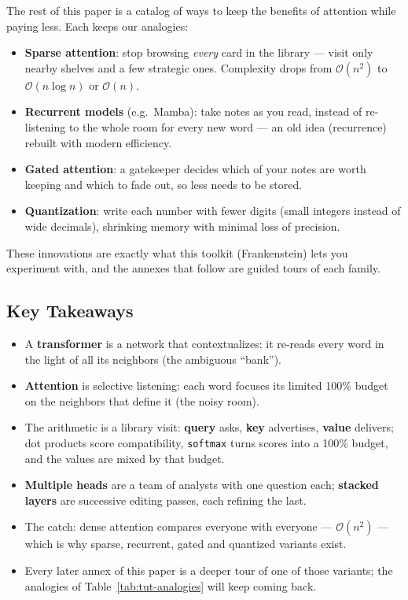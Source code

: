 The rest of this paper is a catalog of ways to keep the benefits of attention while paying less. Each keeps our analogies:

\begin{itemize}[leftmargin=*]
    \item \textbf{Sparse attention}: stop browsing \emph{every} card in the library --- visit only nearby shelves and a few strategic ones. Complexity drops from $\mathcal{O}(n^2)$ to $\mathcal{O}(n \log n)$ or $\mathcal{O}(n)$.
    \item \textbf{Recurrent models} (e.g.\ Mamba): take notes as you read, instead of re-listening to the whole room for every new word --- an old idea (recurrence) rebuilt with modern efficiency.
    \item \textbf{Gated attention}: a gatekeeper decides which of your notes are worth keeping and which to fade out, so less needs to be stored.
    \item \textbf{Quantization}: write each number with fewer digits (small integers instead of wide decimals), shrinking memory with minimal loss of precision.
\end{itemize}

These innovations are exactly what this toolkit (Frankenstein) lets you experiment with, and the annexes that follow are guided tours of each family.

\subsection{Key Takeaways}

\begin{itemize}[leftmargin=*]
    \item A \textbf{transformer} is a network that contextualizes: it re-reads every word in the light of all its neighbors (the ambiguous ``bank'').
    \item \textbf{Attention} is selective listening: each word focuses its limited 100\% budget on the neighbors that define it (the noisy room).
    \item The arithmetic is a library visit: \textbf{query} asks, \textbf{key} advertises, \textbf{value} delivers; dot products score compatibility, \texttt{softmax} turns scores into a 100\% budget, and the values are mixed by that budget.
    \item \textbf{Multiple heads} are a team of analysts with one question each; \textbf{stacked layers} are successive editing passes, each refining the last.
    \item The catch: dense attention compares everyone with everyone --- $\mathcal{O}(n^2)$ --- which is why sparse, recurrent, gated and quantized variants exist.
    \item Every later annex of this paper is a deeper tour of one of those variants; the analogies of Table~\ref{tab:tut-analogies} will keep coming back.
\end{itemize}
